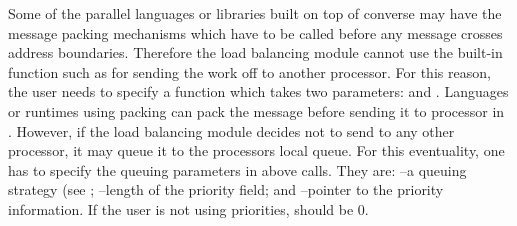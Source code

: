 Some of the parallel languages or libraries built on top of converse
may have the message packing mechanisms which have to be called before
any message crosses address boundaries. Therefore the load balancing
module cannot use the built-in function such as 
for sending the work off to another processor. For this reason, the
user needs to specify a function  which takes two
parameters:   and . Languages or
runtimes using packing can pack the message before sending it to
processor  in . However, if the load
balancing module decides not to send  to any other
processor, it may queue it to the processors local queue. For this
eventuality, one has to specify the queuing parameters in above calls.
They are:  --a queuing strategy (see
; --length of the priority
field; and --pointer to the priority information. If the
user is not using priorities,  should be 0.


%
%
%
%

